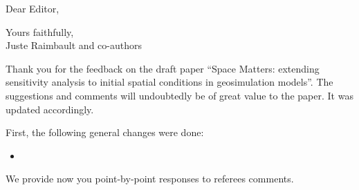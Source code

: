 \documentclass[11pt,a4paper,sans]{moderncv}        %
\begin{document}
\date{\today}
\opening{Dear Editor,}
\closing{Yours faithfully,\\
Juste Raimbault and co-authors%
}




\justify


Thank you for the feedback on the draft paper ``Space Matters: extending sensitivity analysis to initial spatial conditions in geosimulation models''. The suggestions and comments will undoubtedly be of great value to the paper. It was updated accordingly.

\medskip







First, the following general changes were done:

\begin{itemize}
	\item
\end{itemize}

\medskip



We provide now you point-by-point responses to referees comments.
\end{document}
